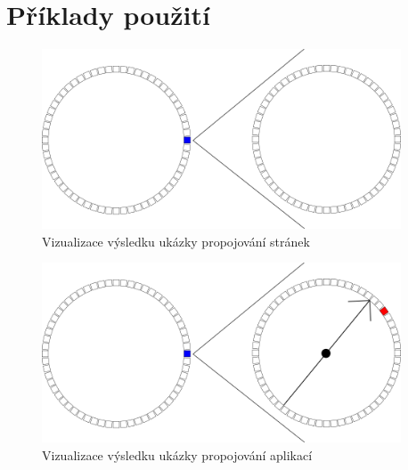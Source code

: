 \newpage

\section{Příklady použití}



\begin{figure}[H]
    \begin{small}
        \begin{center}
            \includegraphics[width=0.95\textwidth]{img/pageLink.png}
        \end{center}
        \caption{Vizualizace výsledku ukázky propojování stránek}
        \label{fig:pageLink}
    \end{small}
\end{figure}

\newpage



\begin{figure}[H]
    \begin{small}
        \begin{center}
            \includegraphics[width=0.95\textwidth]{img/appLink.png}
        \end{center}
        \caption{Vizualizace výsledku ukázky propojování aplikací}
        \label{fig:appLink}
    \end{small}
\end{figure}

